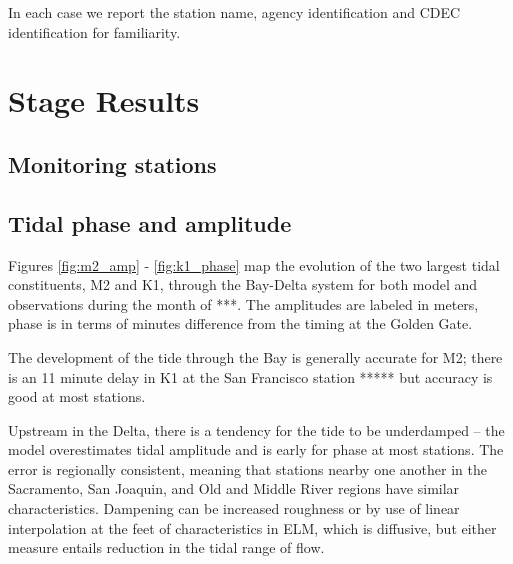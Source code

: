 In each case we report the station name, agency identification and CDEC identification for familiarity. 
\vfill
\section{Stage Results}
	   
  \subsection{Monitoring stations}
  \subsection{Tidal phase and amplitude}
	  Figures \ref{fig:m2_amp} - \ref{fig:k1_phase} map the evolution of the two 
		largest tidal constituents, M2 and K1, through the Bay-Delta 
		system for both model and observations during the month of ***. The amplitudes are labeled in meters, 
		phase is in terms of minutes difference from the timing at the Golden Gate. 
		
		The development of the tide through the Bay is generally accurate for M2; 
		there is an 11 minute delay in K1 at the San Francisco 
		station ***** but accuracy is good at most stations.
		
		Upstream in the Delta, there is a tendency for the tide to be underdamped -- the model overestimates 
		tidal amplitude and is early for phase at most stations. The error is regionally consistent, 
		meaning that stations nearby one another in the Sacramento, San Joaquin, 
		and Old and Middle River regions have similar characteristics. 
		Dampening can be increased roughness or by use of linear interpolation at the feet of characteristics
		in ELM, which is diffusive, but either measure entails reduction in the tidal range of flow. 
				

